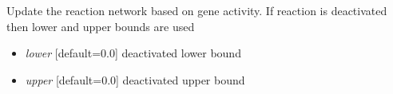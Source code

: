 \documentclass[a4paper,11pt,english]{sphinxmanual}
\begin{document}
\begin{fulllineitems}

\begin{fulllineitems}
\label{modules_doc:cbmpy.CBModel.Model.updateNetwork}
Update the reaction network based on gene activity. If reaction is deactivated then lower and upper bounds are used
\begin{itemize}
\item {} 
\emph{lower} {[}default=0.0{]} deactivated lower bound

\item {} 
\emph{upper} {[}default=0.0{]} deactivated upper bound

\end{itemize}

\end{fulllineitems}


\end{fulllineitems}

\end{document}
